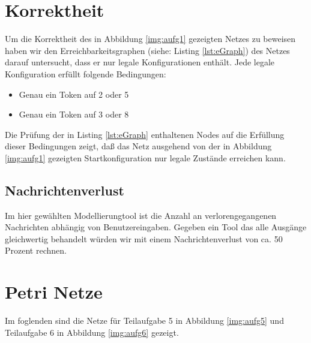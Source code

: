 \documentclass[10pt]{scrartcl}
\begin{document}
	
\section{Korrektheit}
Um die Korrektheit des in Abbildung \ref{img:aufg1} gezeigten Netzes zu beweisen haben wir den Erreichbarkeitsgraphen (siehe: Listing \ref{lst:eGraph}) des Netzes darauf untersucht, dass er nur legale Konfigurationen enthält.
Jede legale Konfiguration erfüllt folgende Bedingungen:
\begin{itemize}
	\item Genau ein Token auf 2 oder 5
	\item Genau ein Token auf 3 oder 8
\end{itemize}

Die Prüfung der in Listing \ref{lst:eGraph} enthaltenen Nodes auf die Erfüllung dieser Bedingungen zeigt, daß das Netz ausgehend von der in Abbildung \ref{img:aufg1} gezeigten Startkonfiguration nur legale Zustände erreichen kann.



\subsection{Nachrichtenverlust}
Im hier gewählten Modellierungtool ist die Anzahl an verlorengegangenen Nachrichten abhängig von Benutzereingaben. Gegeben ein Tool das alle Ausgänge gleichwertig behandelt würden wir mit einem Nachrichtenverlust von ca. 50 Prozent rechnen.

\section{Petri Netze}
	Im foglenden sind die Netze für Teilaufgabe 5 in Abbildung \ref{img:aufg5} und Teilaufgabe 6 in Abbildung \ref{img:aufg6} gezeigt.
\end{document}

